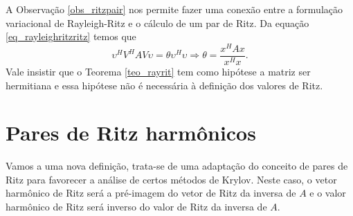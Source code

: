 A Observação \ref{obs_ritzpair} nos permite fazer uma conexão entre a formulação variacional de Rayleigh-Ritz e o cálculo de um par de Ritz. Da equação \eqref{eq_rayleighritzritz} temos que
\[
\upsilon^HV^HAV\upsilon = \theta\upsilon^H\upsilon\Rightarrow \theta=\frac{\displaystyle x^HAx}{\displaystyle x^Hx}.
\]
Vale insistir que o Teorema \ref{teo_rayrit} tem como hip\'{o}tese a matriz ser hermitiana e essa hip\'{o}tese  não é necessária à definição dos valores de Ritz.

\section{Pares de Ritz harmônicos}\label{sec_parritzharm}

Vamos a uma nova definição, trata-se de uma adaptação do conceito de pares de Ritz para favorecer a análise de certos métodos de Krylov. Neste caso, o vetor harmônico de Ritz será a pré-imagem do vetor de Ritz da inversa de $A$ e o valor harmônico de Ritz será inverso do valor de Ritz da inversa de $A$.

